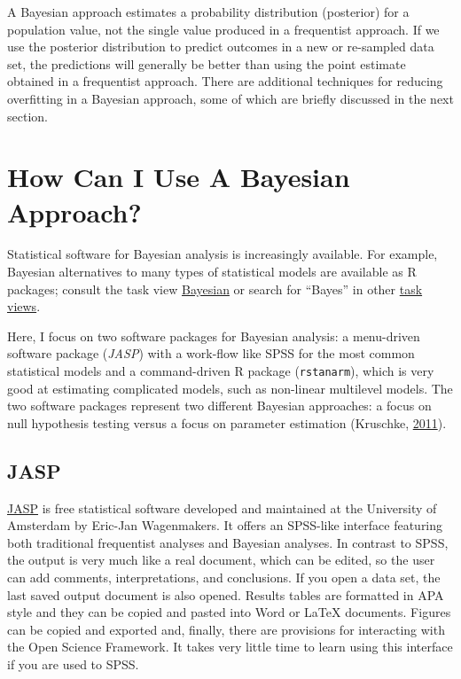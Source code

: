\documentclass[doc]{apa6}
\begin{document}
A Bayesian approach estimates a probability distribution (posterior) for
a population value, not the single value produced in a frequentist
approach. If we use the posterior distribution to predict outcomes in a
new or re-sampled data set, the predictions will generally be better
than using the point estimate obtained in a frequentist approach. There
are additional techniques for reducing overfitting in a Bayesian
approach, some of which are briefly discussed in the next section.

\section{How Can I Use A Bayesian Approach?}\label{usebayesian}

Statistical software for Bayesian analysis is increasingly available.
For example, Bayesian alternatives to many types of statistical models
are available as R packages; consult the task view
\href{https://cran.r-project.org/web/views/Bayesian.html}{Bayesian} or
search for \enquote{Bayes} in other
\href{https://cran.r-project.org/web/views/}{task views}.

Here, I focus on two software packages for Bayesian analysis: a
menu-driven software package (\emph{JASP}) with a work-flow like SPSS
for the most common statistical models and a command-driven R package
(\texttt{rstanarm}), which is very good at estimating complicated
models, such as non-linear multilevel models. The two software packages
represent two different Bayesian approaches: a focus on null hypothesis
testing versus a focus on parameter estimation (Kruschke,
\protect\hyperlink{ref-kruschkeBayesianAssessmentNull2011}{2011}).

\subsection{JASP}\label{jasp}

\href{https://jasp-stats.org/}{JASP} is free statistical software
developed and maintained at the University of Amsterdam by Eric-Jan
Wagenmakers. It offers an SPSS-like interface featuring both traditional
frequentist analyses and Bayesian analyses. In contrast to SPSS, the
output is very much like a real document, which can be edited, so the
user can add comments, interpretations, and conclusions. If you open a
data set, the last saved output document is also opened. Results tables
are formatted in APA style and they can be copied and pasted into Word
or LaTeX documents. Figures can be copied and exported and, finally,
there are provisions for interacting with the Open Science Framework. It
takes very little time to learn using this interface if you are used to
SPSS.
\end{document}
